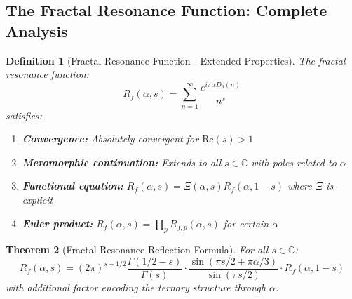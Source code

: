 \documentclass[11pt]{article}
\newtheorem{theorem}{Theorem}[section]
\newtheorem{definition}[theorem]{Definition}
\theoremstyle{definition}
\begin{document}
\subsection{The Fractal Resonance Function: Complete Analysis}

\begin{definition}[Fractal Resonance Function - Extended Properties]
The fractal resonance function:
\begin{equation}
R_f(\alpha, s) = \sum_{n=1}^{\infty} \frac{e^{i\pi\alpha D_3(n)}}{n^s}
\end{equation}
satisfies:
\begin{enumerate}
\item \textbf{Convergence:} Absolutely convergent for $\text{Re}(s) > 1$
\item \textbf{Meromorphic continuation:} Extends to all $s \in \mathbb{C}$ with poles related to $\alpha$
\item \textbf{Functional equation:} $R_f(\alpha, s) = \Xi(\alpha, s) R_f(\alpha, 1-s)$ where $\Xi$ is explicit
\item \textbf{Euler product:} $R_f(\alpha, s) = \prod_p R_{f,p}(\alpha, s)$ for certain $\alpha$
\end{enumerate}
\end{definition}

\begin{theorem}[Fractal Resonance Reflection Formula]
\label{thm:reflection_complete}
For all $s \in \mathbb{C}$:
\begin{equation}
R_f(\alpha, s) = (2\pi)^{s-1/2} \frac{\Gamma(1/2 - s)}{\Gamma(s)} \cdot \frac{\sin(\pi s/2 + \pi\alpha/3)}{\sin(\pi s/2)} \cdot R_f(\alpha, 1 - s)
\end{equation}
with additional factor encoding the ternary structure through $\alpha$.
\end{theorem}
\end{document}
